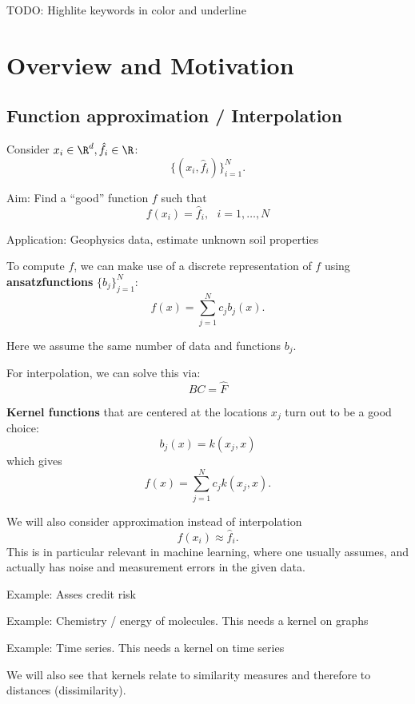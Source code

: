TODO: Highlite keywords in color and underline

\section{Overview and Motivation}

\subsection{Function approximation / Interpolation}

Consider $x_i\in\R^d,\hat{f}_i\in\R$:
\[\{(x_i,\hat{f}_i)\}_{i=1}^N.\]

Aim: Find a ``good''  function $f$ such that 
\[f(x_i)=\hat{f}_i,\text{  } i=1,\dots,N\]

Application: Geophysics data, estimate unknown soil properties

To compute $f$, we can make use of a discrete representation of $f$ using \textbf{ansatzfunctions}
$\{b_j\}_{j=1}^N$:
\[f(x)=\sum_{j=1}^N c_j b_j(x).\]

Here we assume the same number of data and functions $b_j$.

For interpolation, we can solve this via:
\[BC=\hat{F}\]

\textbf{Kernel functions} that are centered at the locations $x_j$ turn out to be a good choice:
\[b_j(x)=k(x_j,x)\]
which gives
\[f(x)=\sum_{j=1}^N c_j k(x_j,x).\]

We will also consider approximation instead of interpolation
\[f(x_i)\approx \hat{f}_i.\]
This is in particular relevant in machine learning, 
where one usually assumes, 
and actually has noise and measurement errors in the given data.

Example: Asses credit risk

Example: Chemistry / energy of molecules. This needs a kernel on graphs

Example: Time series. This needs a kernel on time series

\begin{remark}
    We will also see that kernels relate to similarity measures and therefore to distances (dissimilarity).
\end{remark}

